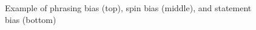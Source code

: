 \begin{figure}[htbp]
    \centering
    \caption{Example of phrasing bias (top), spin bias (middle), and statement bias (bottom) \cite{allsides-media-bias-types}}
    \label{fig:bias-examples}
\end{figure}

